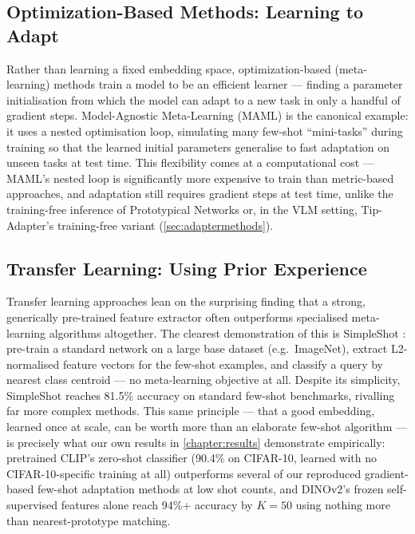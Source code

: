 \documentclass{iutbscthesis}
\begin{document}
\subsection{Optimization-Based Methods: Learning to Adapt}
Rather than learning a fixed embedding space, optimization-based (meta-learning) methods train a model to be an efficient learner --- finding a parameter initialisation from which the model can adapt to a new task in only a handful of gradient steps. Model-Agnostic Meta-Learning (MAML) \cite{finn2017maml} is the canonical example: it uses a nested optimisation loop, simulating many few-shot ``mini-tasks'' during training so that the learned initial parameters generalise to fast adaptation on unseen tasks at test time. This flexibility comes at a computational cost --- MAML's nested loop is significantly more expensive to train than metric-based approaches, and adaptation still requires gradient steps at test time, unlike the training-free inference of Prototypical Networks or, in the VLM setting, Tip-Adapter's training-free variant (\autoref{sec:adaptermethods}).

\subsection{Transfer Learning: Using Prior Experience}
Transfer learning approaches lean on the surprising finding that a strong, generically pre-trained feature extractor often outperforms specialised meta-learning algorithms altogether. The clearest demonstration of this is SimpleShot \cite{tian2020simpleshot}: pre-train a standard network on a large base dataset (e.g.\ ImageNet), extract L2-normalised feature vectors for the few-shot examples, and classify a query by nearest class centroid --- no meta-learning objective at all. Despite its simplicity, SimpleShot reaches 81.5\% accuracy on standard few-shot benchmarks, rivalling far more complex methods. This same principle --- that a good embedding, learned once at scale, can be worth more than an elaborate few-shot algorithm --- is precisely what our own results in \autoref{chapter:results} demonstrate empirically: pretrained CLIP's zero-shot classifier (90.4\% on CIFAR-10, learned with no CIFAR-10-specific training at all) outperforms several of our reproduced gradient-based few-shot adaptation methods at low shot counts, and DINOv2's frozen self-supervised features alone reach 94\%+ accuracy by $K=50$ using nothing more than nearest-prototype matching.
\end{document}
